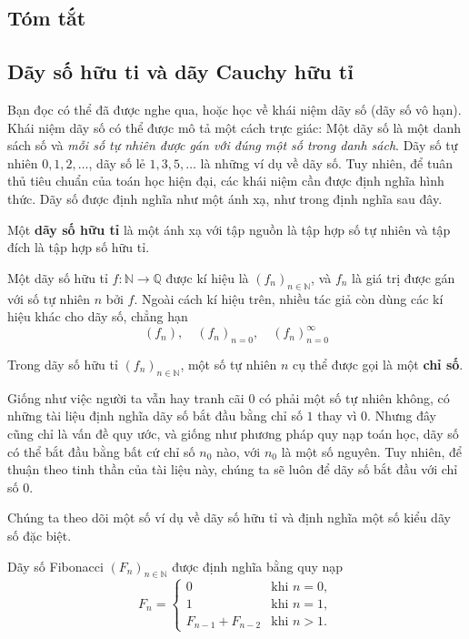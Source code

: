 \subsection{Tóm tắt}

\subsection{Dãy số hữu ti và dãy Cauchy hữu tỉ}

Bạn đọc có thể đã được nghe qua, hoặc học về khái niệm dãy số (dãy số vô hạn). Khái niệm dãy số có thể được mô tả một cách trực giác: Một dãy số là một danh sách số và \textit{mỗi số tự nhiên được gán với đúng một số trong danh sách}. Dãy số tự nhiên $0, 1, 2, \ldots$, dãy số lẻ $1, 3, 5, \ldots$ là những ví dụ về dãy số. Tuy nhiên, để tuân thủ tiêu chuẩn của toán học hiện đại, các khái niệm cần được định nghĩa hình thức. Dãy số được định nghĩa như một ánh xạ, như trong định nghĩa sau đây.

\begin{definition}
    Một \textbf{dãy số hữu tỉ} là một ánh xạ với tập nguồn là tập hợp số tự nhiên và tập đích là tập hợp số hữu tỉ.

    \noindent Một dãy số hữu tỉ $f: \mathbb{N}\to\mathbb{Q}$ được kí hiệu là ${(f_{n})}_{n\in\mathbb{N}}$, và $f_{n}$ là giá trị được gán với số tự nhiên $n$ bởi $f$. Ngoài cách kí hiệu trên, nhiều tác giả còn dùng các kí hiệu khác cho dãy số, chẳng hạn
    \[
        {(f_{n})}, \quad {(f_{n})}_{n=0}, \quad {(f_{n})}^{\infty}_{n=0}
    \]

    \noindent Trong dãy số hữu tỉ ${(f_{n})}_{n\in\mathbb{N}}$, một số tự nhiên $n$ cụ thể được gọi là một \textbf{chỉ số}.
\end{definition}

Giống như việc người ta vẫn hay tranh cãi $0$ có phải một số tự nhiên không, có những tài liệu định nghĩa dãy số bắt đầu bằng chỉ số $1$ thay vì $0$. Nhưng đây cũng chỉ là vấn đề quy ước, và giống như phương pháp quy nạp toán học, dãy số có thể bắt đầu bằng bất cứ chỉ số $n_{0}$ nào, với $n_{0}$ là một số nguyên. Tuy nhiên, để thuận theo tinh thần của tài liệu này, chúng ta sẽ luôn để dãy số bắt đầu với chỉ số $0$.

Chúng ta theo dõi một số ví dụ về dãy số hữu tỉ và định nghĩa một số kiểu dãy số đặc biệt.
\begin{example}
    Dãy số Fibonacci ${(F_{n})}_{n\in\mathbb{N}}$ được định nghĩa bằng quy nạp
    \[
        F_{n} = \begin{cases}
            0                 & \text{khi $n = 0$}, \\
            1                 & \text{khi $n = 1$}, \\
            F_{n-1} + F_{n-2} & \text{khi $n > 1$}.
        \end{cases}
    \]
\end{example}

